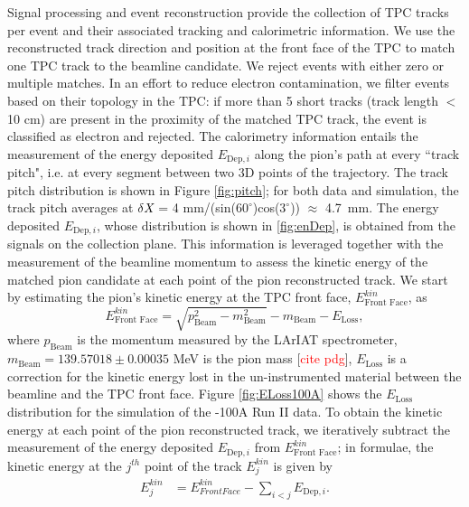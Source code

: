 \documentclass[aps,prl,twocolumn,showpacs,superscriptaddress,groupedaddress]{revtex4}  %
\begin{document}
Signal processing and event reconstruction provide the collection of TPC tracks per event and their associated tracking and calorimetric information. We use the reconstructed track direction and position at the front face of the TPC to match one TPC track to the beamline candidate. We reject events with either zero or multiple matches. In an effort to reduce electron contamination, we filter events based on their topology in the TPC: if more than 5 short tracks (track length $<$ 10 cm) are present in the proximity of the matched TPC track, the event is classified as electron and rejected. The calorimetry information entails the measurement of the energy deposited $E_{\text{Dep},i}$ along the pion's path at every ``track pitch", i.e. at every segment between two 3D points of the trajectory. The track pitch distribution is shown in Figure \ref{fig:pitch}; for both data and simulation, the track pitch averages at $\delta {\emph{X}}$ = 4 mm/(sin($60^{\circ}$)cos($3^{\circ}$)) $\approx$ 4.7~mm. 
The energy deposited $E_{\text{Dep},i}$, whose distribution is shown in \ref{fig:enDep}, is obtained from the signals on the collection plane.  This information is leveraged together with the measurement of the beamline momentum to assess the kinetic energy of the matched pion candidate at each point of the pion reconstructed track. We start by estimating the pion's  kinetic energy at the TPC front face, $ E^{kin}_{\text{Front Face}}$, as 
\begin{equation}
 E^{kin}_{\text{Front Face}}  =  \sqrt{p^2_{\text{Beam}} - m^2_{\text{Beam}}} - m_{\text{Beam}} - E_{\text{Loss}},
\label{eq:enFF}
\end{equation}
where $p_{\text{Beam}}$ is the momentum measured by the LArIAT spectrometer, $m_{\text{Beam}} = 139.57018\pm0.00035$ MeV is the pion mass [\textcolor{red}{cite pdg}], $E_{\text{Loss}}$ is a correction for the kinetic energy lost in the un-instrumented material between the beamline and the TPC front face. Figure \ref{fig:ELoss100A} shows the $E_{\text{Loss}}$ distribution for the simulation of the -100A Run II data. To obtain the kinetic energy at each point of the pion reconstructed track, we iteratively subtract the measurement of the energy deposited $E_{\text{Dep},i}$ from $ E^{kin}_{\text{Front Face}}$; in formulae, the kinetic energy at the $j^{th}$ point of the track  $E_{j}^{kin}$ is given by
\begin{equation}
\begin{split}
 E_{j}^{kin}  & = E^{kin}_{Front Face} -  \sum_{i < j} E_{\text{Dep},i}.
\end{split}
\label{eq:KEj}
\end{equation}
\end{document}
